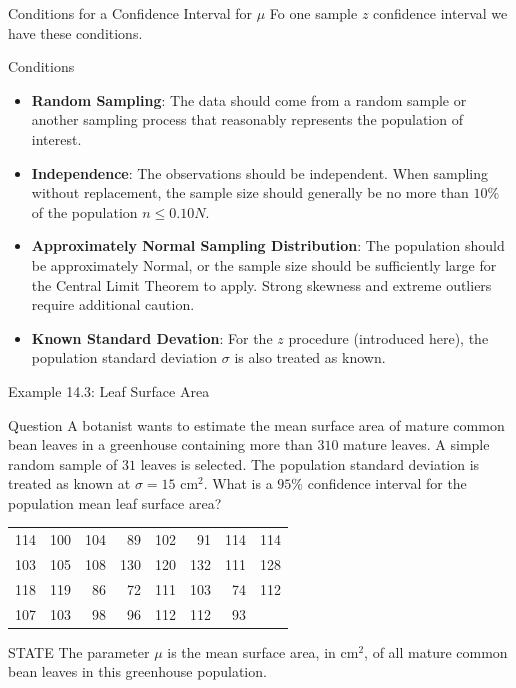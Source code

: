 \documentclass[aspectratio=169]{beamer}
\begin{document}
\begin{frame}{Conditions for a Confidence Interval for $\mu$}
Fo one sample $z$ confidence interval we have these conditions.
\begin{block}{Conditions}
\begin{itemize}
	\item \textbf{Random Sampling}: The data should come from a random sample or another sampling process that reasonably represents the population of interest.
	\item \textbf{Independence}: The observations should be independent. When sampling without replacement, the sample size should generally be no more than $10\%$ of the population $n\leq0.10N$.
	\item \textbf{Approximately Normal Sampling Distribution}: The population should be approximately Normal, or the sample size should be sufficiently large for the Central Limit Theorem to apply. Strong skewness and extreme outliers require additional caution.
	\item \textbf{Known Standard Devation}: For the $z$ procedure (introduced here), the population standard deviation $\sigma$ is also treated as known.
\end{itemize}
\end{block}
\end{frame}

\begin{frame}{Example 14.3: Leaf Surface Area}
\begin{block}{Question}
A botanist wants to estimate the mean surface area of mature common bean leaves in a greenhouse containing more than $310$ mature leaves. A simple random sample of $31$ leaves is selected. The population standard deviation is treated as known at $\sigma=15$ cm$^2$. What is a $95\%$ confidence interval for the population mean leaf surface area?
\scriptsize
\begin{center}
\begin{tabular}{rrrrrrrr}
114 & 100 & 104 & 89 & 102 & 91 & 114 & 114 \\
103 & 105 & 108 & 130 & 120 & 132 & 111 & 128 \\
118 & 119 & 86 & 72 & 111 & 103 & 74 & 112 \\
107 & 103 & 98 & 96 & 112 & 112 & 93 & \\
\end{tabular}
\end{center}
\end{block}

\begin{block}{STATE}
The parameter $\mu$ is the mean surface area, in cm$^2$, of all mature common bean leaves in this greenhouse population.
\end{block}
\end{frame}
\end{document}
